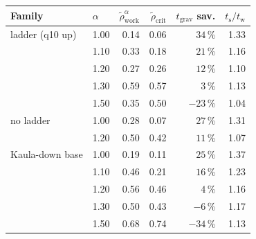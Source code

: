 \setlength{\tabcolsep}{4pt}
\begin{tabular}{@{}l l r r r r@{}}
\toprule
Family & $\alpha$ & $\tilde\rho_{\mathrm{work}}^{\alpha}$ & $\tilde\rho_{\mathrm{crit}}$ & $t_{\mathrm{grav}}$ sav. & $t_{\mathrm{s}}/t_{\mathrm{w}}$ \\
\midrule
ladder (q10 up) & 1.00 & 0.14 & 0.06 & $34$\,\% & 1.33 \\
 & 1.10 & 0.33 & 0.18 & $21$\,\% & 1.16 \\
 & 1.20 & 0.27 & 0.26 & $12$\,\% & 1.10 \\
 & 1.30 & 0.59 & 0.57 & $3$\,\% & 1.13 \\
 & 1.50 & 0.35 & 0.50 & $-23$\,\% & 1.04 \\
\midrule
no ladder & 1.00 & 0.28 & 0.07 & $27$\,\% & 1.31 \\
 & 1.20 & 0.50 & 0.42 & $11$\,\% & 1.07 \\
\midrule
Kaula-down base & 1.00 & 0.19 & 0.11 & $25$\,\% & 1.37 \\
 & 1.10 & 0.46 & 0.21 & $16$\,\% & 1.23 \\
 & 1.20 & 0.56 & 0.46 & $4$\,\% & 1.16 \\
 & 1.30 & 0.50 & 0.43 & $-6$\,\% & 1.17 \\
 & 1.50 & 0.68 & 0.74 & $-34$\,\% & 1.13 \\
\bottomrule
\end{tabular}